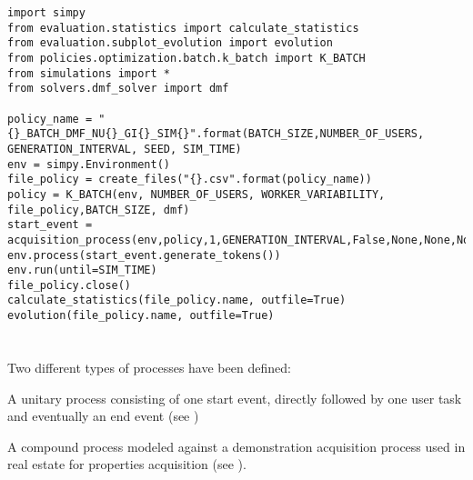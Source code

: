 \begin{lstlisting}[caption={Structure example of simulation framework using a K-Batch policy with \gls{dmf}. Initially dependencies are imported. Afterwards the discrete event simulation environment, a policy file for storing statistical data, a policy and a process returning its start event are initialized. Finally, by calling the environment's run method the simulation is started.},label=lst:simulation_script,style=CustomPython]
import simpy
from evaluation.statistics import calculate_statistics
from evaluation.subplot_evolution import evolution
from policies.optimization.batch.k_batch import K_BATCH
from simulations import *
from solvers.dmf_solver import dmf

policy_name = "{}_BATCH_DMF_NU{}_GI{}_SIM{}".format(BATCH_SIZE,NUMBER_OF_USERS, GENERATION_INTERVAL, SEED, SIM_TIME)
env = simpy.Environment()
file_policy = create_files("{}.csv".format(policy_name))
policy = K_BATCH(env, NUMBER_OF_USERS, WORKER_VARIABILITY, file_policy,BATCH_SIZE, dmf)
start_event = acquisition_process(env,policy,1,GENERATION_INTERVAL,False,None,None,None)
env.process(start_event.generate_tokens())
env.run(until=SIM_TIME)
file_policy.close()
calculate_statistics(file_policy.name, outfile=True)
evolution(file_policy.name, outfile=True)
\end{lstlisting}

\section{}

Two different types of processes have been defined:
\begin{enumerate*}
	\item A unitary process consisting of one start event, directly followed by one user task and eventually an end event (see )
	\item A compound process modeled against a demonstration acquisition process used in real estate for properties acquisition (see ).
\end{enumerate*}




